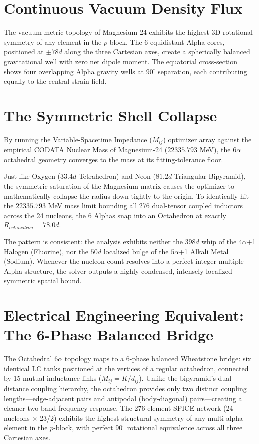 \section{Continuous Vacuum Density Flux}
The vacuum metric topology of Magnesium-24 exhibits the highest 3D rotational symmetry of any element in the $p$-block. The 6 equidistant Alpha cores, positioned at $\pm 78d$ along the three Cartesian axes, create a spherically balanced gravitational well with zero net dipole moment. The equatorial cross-section shows four overlapping Alpha gravity wells at $90^\circ$ separation, each contributing equally to the central strain field.

\section{The Symmetric Shell Collapse}
By running the Variable-Spacetime Impedance ($M_{ij}$) optimizer array against the empirical CODATA Nuclear Mass of Magnesium-24 ($22335.793$ MeV), the $6\alpha$ octahedral geometry converges to the mass at its fitting-tolerance floor.

Just like Oxygen ($33.4d$ Tetrahedron) and Neon ($81.2d$ Triangular Bipyramid), the symmetric saturation of the Magnesium matrix causes the optimizer to mathematically collapse the radius down tightly to the origin. To identically hit the $22335.793$ MeV mass limit bounding all 276 dual-tensor coupled inductors across the 24 nucleons, the 6 Alphas snap into an Octahedron at exactly $R_{octahedron} = 78.0d$.

The pattern is consistent: the analysis exhibits neither the $398d$ whip of the $4\alpha$+1 Halogen (Fluorine), nor the $50d$ localized bulge of the $5\alpha$+1 Alkali Metal (Sodium). Whenever the nucleon count resolves into a perfect integer-multiple Alpha structure, the solver outputs a highly condensed, intensely localized symmetric spatial bound.

\section{Electrical Engineering Equivalent: The 6-Phase Balanced Bridge}
The Octahedral $6\alpha$ topology maps to a 6-phase balanced Wheatstone bridge: six identical LC tanks positioned at the vertices of a regular octahedron, connected by 15 mutual inductance links ($M_{ij} = K/d_{ij}$). Unlike the bipyramid's dual-distance coupling hierarchy, the octahedron provides only two distinct coupling lengths---edge-adjacent pairs and antipodal (body-diagonal) pairs---creating a cleaner two-band frequency response. The 276-element SPICE network (24 nucleons $\times$ 23/2) exhibits the highest structural symmetry of any multi-alpha element in the $p$-block, with perfect 90$^\circ$ rotational equivalence across all three Cartesian axes.

